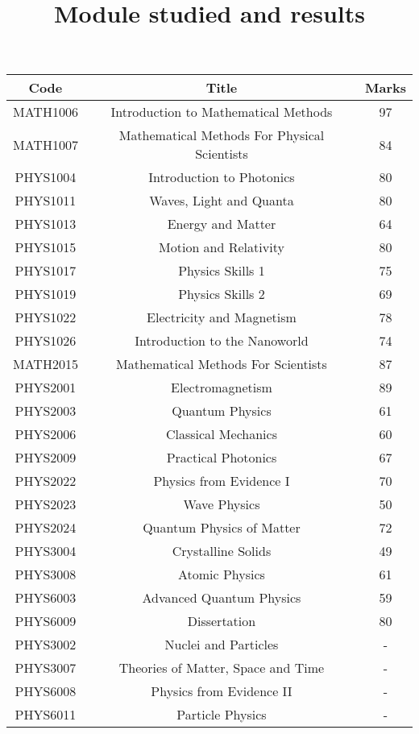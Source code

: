 \documentclass[11pt, oneside]{article}   	%
\title{Module studied and results}
\begin{document}
\maketitle

\begin{table}[htdp]
\begin{center}
\begin{tabular}{|c|c|c|}
\hline
Code&Title&Marks\\ \hline
MATH1006&Introduction to Mathematical Methods&97\\ 
MATH1007&Mathematical Methods For Physical Scientists&84 \\ 
PHYS1004&Introduction to Photonics&80\\
PHYS1011&Waves, Light and Quanta&80\\
PHYS1013&Energy and Matter&64\\
PHYS1015&Motion and Relativity&80\\
PHYS1017&Physics Skills 1&75\\
PHYS1019&Physics Skills 2&69\\
PHYS1022&Electricity and Magnetism&78\\
PHYS1026&Introduction to the Nanoworld&74\\
MATH2015&Mathematical Methods For Scientists&87\\
PHYS2001&Electromagnetism&89\\
PHYS2003&Quantum Physics&61\\
PHYS2006&Classical Mechanics&60\\
PHYS2009&Practical Photonics&67\\
PHYS2022&Physics from Evidence I&70\\
PHYS2023&Wave Physics&50\\
PHYS2024&Quantum Physics of Matter&72\\
PHYS3004&Crystalline Solids&49\\
PHYS3008&Atomic Physics&61\\
PHYS6003&Advanced Quantum Physics&59\\
PHYS6009&Dissertation&80\\
PHYS3002&Nuclei and Particles&-\\
PHYS3007&Theories of Matter, Space and Time&-\\
PHYS6008&Physics from Evidence II&-\\
PHYS6011&Particle Physics&-\\
\hline
\end{tabular}
\end{center}
\label{default}
\end{table}
\end{document}
